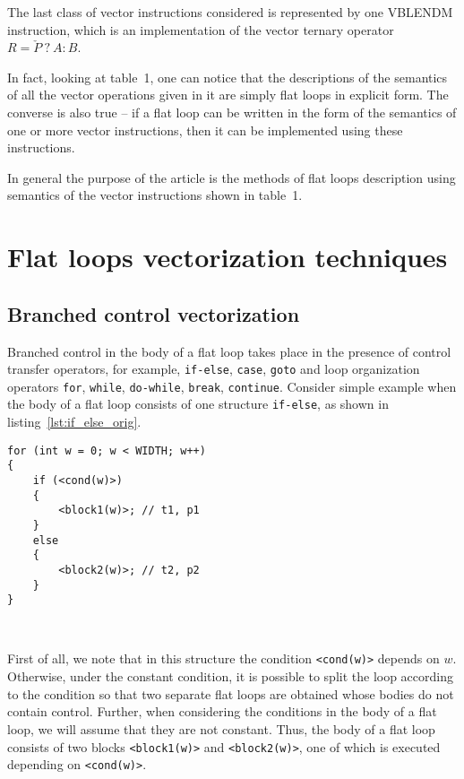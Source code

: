 \documentclass[
11pt,%
tightenlines,%
twoside,%
onecolumn,%
nofloats,%
nobibnotes,%
nofootinbib,%
superscriptaddress,%
noshowpacs,%
centertags]%
{revtex4}
\begin{document}
The last class of vector instructions considered is represented by one VBLENDM instruction, which is an implementation of the vector ternary operator $R = \check{P} \ ? \ A : B$.

In fact, looking at table~1, one can notice that the descriptions of the semantics of all the vector operations given in it are simply flat loops in explicit form.
The converse is also true -- if a flat loop can be written in the form of the semantics of one or more vector instructions, then it can be implemented using these instructions.

In general the purpose of the article is the methods of flat loops description using semantics of the vector instructions shown in table~1.

\section{Flat loops vectorization techniques}

\subsection{Branched control vectorization}

Branched control in the body of a flat loop takes place in the presence of control transfer operators, for example, \texttt{if-else}, \texttt{case}, \texttt{goto} and loop organization operators \texttt{for}, \texttt{while}, \texttt{do-while}, \texttt{break}, \texttt{continue}.
Consider simple example when the body of a flat loop consists of one structure \texttt{if-else}, as shown in listing~\ref{lst:if_else_orig}.

\begin{lstlisting}[caption={The body of a flat loop, consisting of \texttt{if-else} structure.},label={lst:if_else_orig}]
for (int w = 0; w < WIDTH; w++)
{
    if (<cond(w)>)
    {
        <block1(w)>; // t1, p1
    }
    else
    {
        <block2(w)>; // t2, p2
    }
}
\end{lstlisting}

\

First of all, we note that in this structure the condition \texttt {<cond(w)>} depends on $w$.
Otherwise, under the constant condition, it is possible to split the loop according to the condition so that two separate flat loops are obtained whose bodies do not contain control.
Further, when considering the conditions in the body of a flat loop, we will assume that they are not constant.
Thus, the body of a flat loop consists of two blocks \texttt{<block1(w)>} and \texttt{<block2(w)>}, one of which is executed depending on \texttt{<cond(w)>}.
\end{document}
